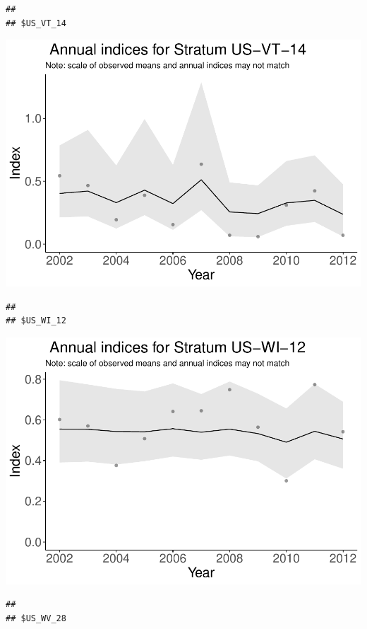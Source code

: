 \documentclass[]{article}
\begin{document}
\begin{verbatim}
## 
## $US_VT_14
\end{verbatim}

\includegraphics{index_files/figure-latex/unnamed-chunk-7-28.pdf}

\begin{verbatim}
## 
## $US_WI_12
\end{verbatim}

\includegraphics{index_files/figure-latex/unnamed-chunk-7-29.pdf}

\begin{verbatim}
## 
## $US_WV_28
\end{verbatim}
\end{document}
